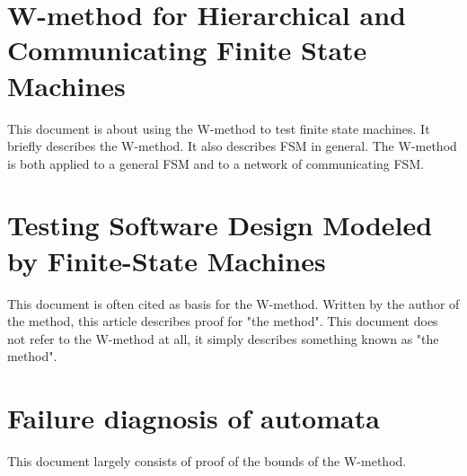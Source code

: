 \section{W-method for Hierarchical and Communicating Finite State Machines}
This document is about using the W-method to test finite state machines.
It briefly describes the W-method.
It also describes FSM in general.
The W-method is both applied to a general FSM and to a network of communicating FSM.

\section{Testing Software Design Modeled by Finite-State Machines}
This document is often cited as basis for the W-method.
Written by the author of the method, this article describes proof for "the method".
This document does not refer to the W-method at all, it simply describes something known as "the method".


\section{Failure diagnosis of automata}
This document largely consists of proof of the bounds of the W-method.
